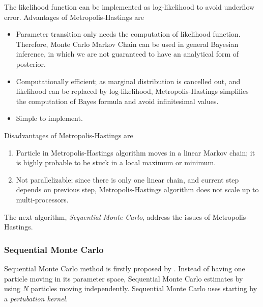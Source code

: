 The likelihood function can be implemented as log-likelihood to avoid underflow error.
Advantages of Metropolis-Hastings are
\begin{itemize}
      \item Parameter transition only needs the computation of likelihood function.
            Therefore, Monte Carlo Markov Chain can be used in general Bayesian inference,
            in which we are not guaranteed to have an analytical form of posterior.
      \item Computationally efficient; as marginal distribution is cancelled out, and likelihood can
            be replaced by log-likelihood, Metropolis-Hastings simplifies the computation of Bayes formula
            and avoid infinitesimal values.
      \item Simple to implement.
\end{itemize}
Disadvantages of Metropolis-Hastings are
\begin{enumerate}
      \item Particle in Metropolis-Hastings algorithm moves in a linear Markov chain; it is highly
            probable to be stuck in a local maximum or minimum.
      \item Not parallelizable; since there is only one linear chain, and current step depends on
            previous step, Metropolis-Hastings algorithm does not scale up to multi-processors.
\end{enumerate}
The next algorithm, \textit{Sequential Monte Carlo}, address the issues of Metropolis-Hastings.

\subsubsection{Sequential Monte Carlo}
Sequential Monte Carlo method is firstly proposed by \cite{del2006sequential}.  Instead of having
one particle moving in its parameter space, Sequential Monte Carlo estimates by using $N$ particles
moving independently. Sequential Monte Carlo uses  starting by a \textit{pertubation kernel}.

